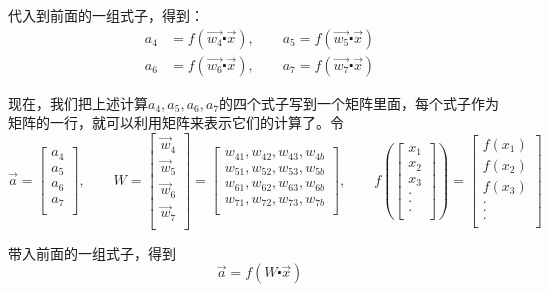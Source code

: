 代入到前面的一组式子，得到：
\begin{align*}
	a_4 & =f(\vec{w_4}\centerdot\vec{x}),\qquad
	a_5=f(\vec{w_5}\centerdot\vec{x})           \\
	a_6 & =f(\vec{w_6}\centerdot\vec{x}),\qquad
	a_7=f(\vec{w_7}\centerdot\vec{x})
\end{align*}


现在，我们把上述计算\(a_4,a_5,a_6,a_7\)的四个式子写到一个矩阵里面，每个式子作为矩阵的一行，就可以利用矩阵来表示它们的计算了。令
\[
	\vec{a}=
	\begin{bmatrix}
		a_4 \\
		a_5 \\
		a_6 \\
		a_7 \\
	\end{bmatrix},\qquad W=
	\begin{bmatrix}
		\vec{w}_4 \\
		\vec{w}_5 \\
		\vec{w}_6 \\
		\vec{w}_7 \\
	\end{bmatrix}=
	\begin{bmatrix}
		w_{41},w_{42},w_{43},w_{4b} \\
		w_{51},w_{52},w_{53},w_{5b} \\
		w_{61},w_{62},w_{63},w_{6b} \\
		w_{71},w_{72},w_{73},w_{7b} \\
	\end{bmatrix}
	,\qquad f(
	\begin{bmatrix}
		x_1 \\
		x_2 \\
		x_3 \\
		.   \\
		.   \\
		.   \\
	\end{bmatrix})=
	\begin{bmatrix}
		f(x_1) \\
		f(x_2) \\
		f(x_3) \\
		.      \\
		.      \\
		.      \\
	\end{bmatrix}
\]

带入前面的一组式子，得到
\begin{equation}
	\label{eq:Bp2}
	\vec{a}=f(W\centerdot\vec{x})
\end{equation}

